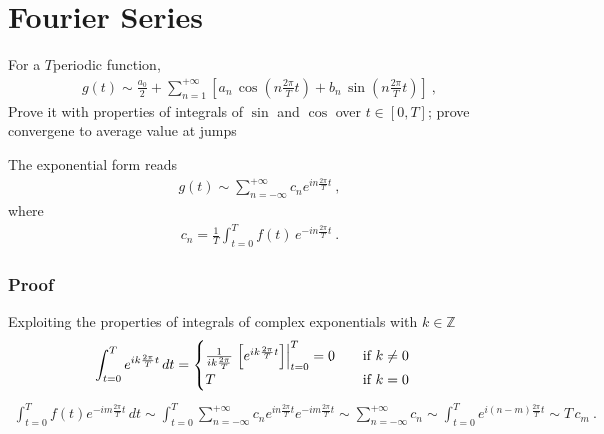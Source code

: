 \documentclass[letterpaper,10pt,english]{jupyterBook}
\begin{document}
\section{Fourier Series}
\label{\detokenize{ch/complex/fourier:fourier-series}}\label{\detokenize{ch/complex/fourier:complex-fourier-fs}}
\sphinxAtStartPar
For a \(T\)\sphinxhyphen{}periodic function,
\begin{equation*}
\begin{split}g(t) \sim \frac{a_0}{2} + \sum_{n=1}^{+\infty} \left[ a_n \, \cos\left( n \frac{2\pi}{T} t \right) + b_n \, \sin\left( n \frac{2 \pi }{T} t \right) \right] \ ,\end{split}
\end{equation*}
\sphinxAtStartPar
{} Prove it with properties of integrals of \(\sin\) and \(\cos\) over \(t \in \left[ 0, T \right]\); prove convergene to average value at jumps

\sphinxAtStartPar
The exponential form reads
\begin{equation}\label{equation:ch/complex/fourier:eq:fourier-series:exp}
\begin{split}g(t) \sim \sum_{n=-\infty}^{+\infty} c_n e^{i n \frac{2 \pi }{T}t} \ ,\end{split}
\end{equation}
\sphinxAtStartPar
where
\begin{equation}\label{equation:ch/complex/fourier:eq:fourier-series:exp:coeff}
\begin{split}c_n = \frac{1}{T} \int_{t=0}^{T} f(t) \, e^{-i n \frac{2\pi}{T} t} \ .\end{split}
\end{equation}\subsubsection*{Proof}

\sphinxAtStartPar
Exploiting the properties of integrals of complex exponentials with \(k \in \mathbb{Z}\)
\begin{equation*}
\begin{split}\int_{t=0}^{T} e^{i k \frac{2 \pi}{T} t} \, dt = 
\begin{cases}
\frac{1}{i k \frac{2 \pi}{T}} \left.\left[ e^{ik \frac{2\pi}{T} t} \right]\right|_{t=0}^{T} = 0 \hfill \qquad \text{if $ k \ne 0$} \\
T \hfill \text{if $ k = 0$}
\end{cases}
\end{split}
\end{equation*}\begin{equation*}
\begin{split}\int_{t=0}^{T} f(t) e^{-i m \frac{2 \pi}{T} t} \, dt
 \sim \int_{t=0}^{T} \sum_{n=-\infty}^{+\infty} c_n e^{i n \frac{2 \pi }{T}t}  e^{-i m \frac{2 \pi}{T} t}
 \sim \sum_{n=-\infty}^{+\infty} c_n \sim \int_{t=0}^{T} e^{i (n-m) \frac{2 \pi }{T}t} 
 \sim T \, c_m \ .
\end{split}
\end{equation*}
\end{document}
